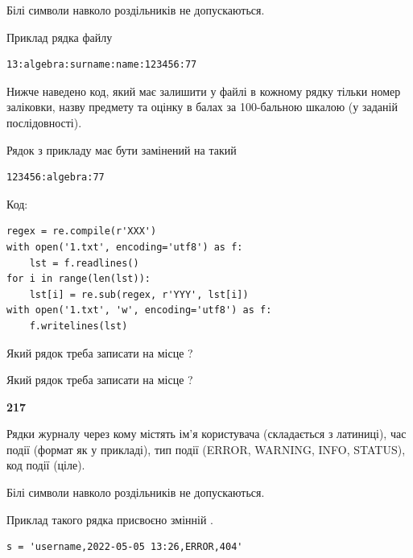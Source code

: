 Білі символи навколо роздільників не допускаються.

Приклад рядка файлу



\begin{verbatim}
13:algebra:surname:name:123456:77
\end{verbatim}


Нижче наведено код, який має залишити у файлі в кожному рядку тільки номер заліковки, назву предмету та оцінку в балах за 100-бальною шкалою (у заданій послі\-дов\-ності).

Рядок з прикладу має бути замінений на такий



\begin{verbatim}
123456:algebra:77
\end{verbatim}




Код:



\begin{verbatim}
regex = re.compile(r'XXX')
with open('1.txt', encoding='utf8') as f:
    lst = f.readlines()
for i in range(len(lst)):
    lst[i] = re.sub(regex, r'YYY', lst[i])
with open('1.txt', 'w', encoding='utf8') as f:
    f.writelines(lst)
\end{verbatim}







Який рядок треба записати на місце  ?\par
\vspace{5mm}


Який рядок треба записати на місце  ?\par


\newpage

{\begin {center}\textbf{ 217}\end {center}}\par
Рядки журналу через кому містять ім'я користувача (складається з латиниці), час події (фор\-мат як у прикладі), тип події (ERROR, WARNING, INFO, STATUS), код події (ціле).

Білі символи навколо роздільників не допускаються.

Приклад такого рядка присвоєно змінній .



\begin{verbatim}
s = 'username,2022-05-05 13:26,ERROR,404'
\end{verbatim}


